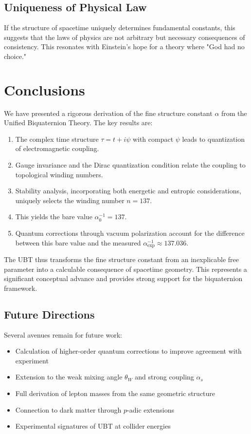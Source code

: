\documentclass[12pt, a4paper]{article}
\theoremstyle{definition}
\theoremstyle{remark}
\begin{document}
\subsection{Uniqueness of Physical Law}

If the structure of spacetime uniquely determines fundamental constants, this suggests that the laws of physics are not arbitrary but necessary consequences of consistency. This resonates with Einstein's hope for a theory where "God had no choice."

\section{Conclusions}

We have presented a rigorous derivation of the fine structure constant $\alpha$ from the Unified Biquaternion Theory. The key results are:

\begin{enumerate}
\item The complex time structure $\tau = t + i\psi$ with compact $\psi$ leads to quantization of electromagnetic coupling.

\item Gauge invariance and the Dirac quantization condition relate the coupling to topological winding numbers.

\item Stability analysis, incorporating both energetic and entropic considerations, uniquely selects the winding number $n = 137$.

\item This yields the bare value $\alpha_0^{-1} = 137$.

\item Quantum corrections through vacuum polarization account for the difference between this bare value and the measured $\alpha_{\text{exp}}^{-1} \approx 137.036$.
\end{enumerate}

The UBT thus transforms the fine structure constant from an inexplicable free parameter into a calculable consequence of spacetime geometry. This represents a significant conceptual advance and provides strong support for the biquaternion framework.

\subsection{Future Directions}

Several avenues remain for future work:
\begin{itemize}
\item Calculation of higher-order quantum corrections to improve agreement with experiment
\item Extension to the weak mixing angle $\theta_W$ and strong coupling $\alpha_s$
\item Full derivation of lepton masses from the same geometric structure
\item Connection to dark matter through $p$-adic extensions
\item Experimental signatures of UBT at collider energies
\end{itemize}
\end{document}
